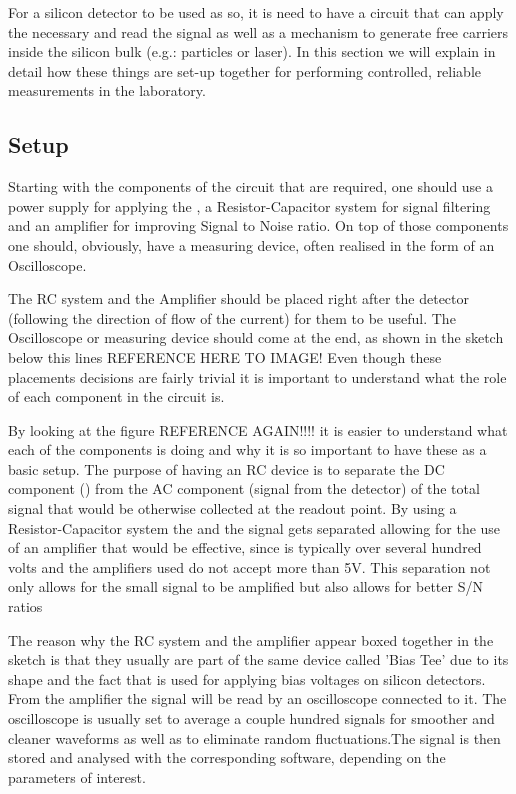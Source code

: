 For a silicon detector to be used as so, it is need to have a circuit that can apply the necessary \vias and read the signal as well as a mechanism to generate free carriers inside the silicon bulk (e.g.: particles or laser). In this section we will explain in detail how these things are set-up together for performing controlled, reliable measurements in the laboratory.

\subsection{Setup} 

Starting with the components of the circuit that are required, one should use a power supply for applying the \vias, a Resistor-Capacitor system for signal filtering and an amplifier for improving Signal to Noise ratio. On top of those components one should, obviously, have a measuring device, often realised in the form of an Oscilloscope.

The RC system and the Amplifier should be placed right after the detector (following the direction of flow of the current) for them to be useful. The Oscilloscope or measuring device should come at the end, as shown in the sketch below this lines REFERENCE HERE TO IMAGE! Even though these placements decisions are fairly trivial it is important to understand what the role of each component in the circuit is.

By looking at the figure REFERENCE AGAIN!!!! it is easier to understand what each of the components is doing and why it is so important to have these as a basic setup. The purpose of having an RC device is to separate the DC component (\vias) from the AC component (signal from the detector) of the total signal that would be otherwise collected at the readout point. By using a Resistor-Capacitor system the \vias and the signal gets separated allowing for the use of an amplifier that would be effective, since \vias is typically over several hundred volts and the amplifiers used do not accept more than 5V. This separation not only allows for the small signal to be amplified but also allows for better S/N ratios 

The reason why the RC system and the amplifier appear boxed together in the sketch is that they usually are part of the same device called 'Bias Tee' due to its shape and the fact that is used for applying bias voltages on silicon detectors. From the amplifier the signal will be read by an oscilloscope connected to it. The oscilloscope is usually set to average a couple hundred signals for smoother and cleaner waveforms as well as to eliminate random fluctuations.The signal is then stored and analysed with the corresponding software, depending on the parameters of interest.

